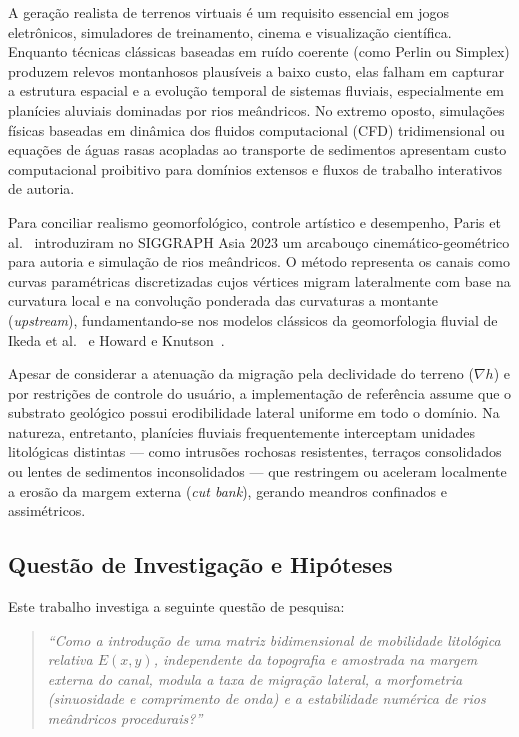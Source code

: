 \documentclass[10pt,twocolumn,a4paper]{article}
\begin{document}
A geração realista de terrenos virtuais é um requisito essencial em jogos eletrônicos, simuladores de treinamento, cinema e visualização científica. Enquanto técnicas clássicas baseadas em ruído coerente (como Perlin ou Simplex) produzem relevos montanhosos plausíveis a baixo custo, elas falham em capturar a estrutura espacial e a evolução temporal de sistemas fluviais, especialmente em planícies aluviais dominadas por rios meândricos. No extremo oposto, simulações físicas baseadas em dinâmica dos fluidos computacional (CFD) tridimensional ou equações de águas rasas acopladas ao transporte de sedimentos apresentam custo computacional proibitivo para domínios extensos e fluxos de trabalho interativos de autoria.

Para conciliar realismo geomorfológico, controle artístico e desempenho, Paris et al.~\cite{paris2023meandering} introduziram no SIGGRAPH Asia 2023 um arcabouço cinemático-geométrico para autoria e simulação de rios meândricos. O método representa os canais como curvas paramétricas discretizadas cujos vértices migram lateralmente com base na curvatura local e na convolução ponderada das curvaturas a montante (\textit{upstream}), fundamentando-se nos modelos clássicos da geomorfologia fluvial de Ikeda et al.~\cite{ikeda1981bend} e Howard e Knutson~\cite{howard1984sufficient}.

Apesar de considerar a atenuação da migração pela declividade do terreno ($\nabla h$) e por restrições de controle do usuário, a implementação de referência assume que o substrato geológico possui erodibilidade lateral uniforme em todo o domínio. Na natureza, entretanto, planícies fluviais frequentemente interceptam unidades litológicas distintas --- como intrusões rochosas resistentes, terraços consolidados ou lentes de sedimentos inconsolidados --- que restringem ou aceleram localmente a erosão da margem externa (\textit{cut bank}), gerando meandros confinados e assimétricos.

\subsection{Questão de Investigação e Hipóteses}
Este trabalho investiga a seguinte questão de pesquisa:
\begin{quote}
\textit{``Como a introdução de uma matriz bidimensional de mobilidade litológica relativa $E(x,y)$, independente da topografia e amostrada na margem externa do canal, modula a taxa de migração lateral, a morfometria (sinuosidade e comprimento de onda) e a estabilidade numérica de rios meândricos procedurais?''}
\end{quote}
\end{document}
